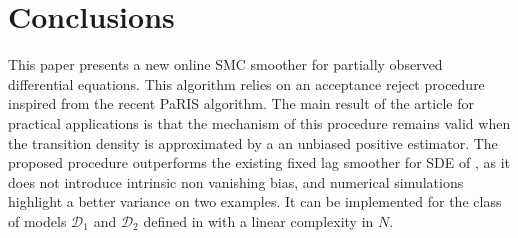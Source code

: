 \documentclass[12pt,draft]{article}
\newcommand{\rmd}{\mathrm{d}}
\newcommand{\eqsp}{\;}
\newcommand{\1}{\mathrm{1}}
\newcommand{\mw}{\mathsf{w}}%
\begin{document}
\section{Conclusions}
This paper presents a new online SMC smoother for partially observed differential equations. This algorithm relies on an acceptance reject procedure inspired from the recent PaRIS algorithm. The main result of the article for practical applications is that the mechanism of this procedure remains valid when the transition density is approximated by a an unbiased positive estimator. The proposed procedure outperforms the existing fixed lag smoother for SDE of \cite{olsson:strojby:2011}, as it does not introduce intrinsic non vanishing bias,  and numerical simulations highlight a better variance on two examples. It can be implemented for the class of models $\mathcal{D}_1$ and $\mathcal{D}_2$ defined in \cite{beskos:papaspiliopoulos:roberts:fearnhead:2006} with a linear complexity in $N$. 
\end{document}
